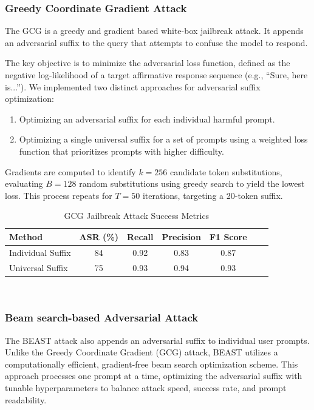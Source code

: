 \documentclass[conference]{IEEEtran}
\begin{document}
\subsubsection{Greedy Coordinate Gradient Attack}
The GCG \cite{zou2023universaltransferableadversarialattacks} is a greedy and gradient based white-box jailbreak attack. It appends an adversarial suffix to the query that attempts to confuse the model to respond. 

The key objective is to minimize the adversarial loss function, defined as the negative log-likelihood of a target affirmative response sequence (e.g., ``Sure, here is...'').
We implemented two distinct approaches for adversarial suffix optimization:
 \begin{enumerate}
    \item Optimizing an adversarial suffix for each individual harmful prompt.
    \item  Optimizing a single universal suffix for a set of prompts using a weighted loss function that prioritizes prompts with higher difficulty.
\end{enumerate}
Gradients are computed to identify \( k = 256 \) candidate token substitutions, evaluating \( B = 128 \) random substitutions using greedy search to yield the lowest loss. This process repeats for \( T = 50 \) iterations, targeting a 20-token suffix. 
\begin{table}[H]
\centering
\caption{GCG Jailbreak Attack Success Metrics}
\label{tab:GCG Attack success metrics}
\begin{tabular}{lcccccc}
\toprule
\textbf{Method} & \textbf{ASR (\%)} & \textbf{Recall} & \textbf{Precision} & \textbf{F1 Score}\\
\midrule
Individual Suffix   & 84 & 0.92  & 0.83  & 0.87  \\
Universal Suffix  & 75 & 0.93  & 0.94  & 0.93  \\
\bottomrule
\end{tabular}
\end{table}
\\

\subsubsection{Beam search-based Adversarial Attack}
The BEAST attack \cite{zou2023universaltransferableadversarialattacks} also appends an adversarial suffix to individual user prompts. Unlike
the Greedy Coordinate Gradient (GCG) attack, BEAST utilizes a computationally efficient, gradient-free beam
search optimization scheme. This approach processes one prompt at a time,
optimizing the adversarial suffix with tunable hyperparameters to balance attack speed, success rate, and prompt readability.
\end{document}

